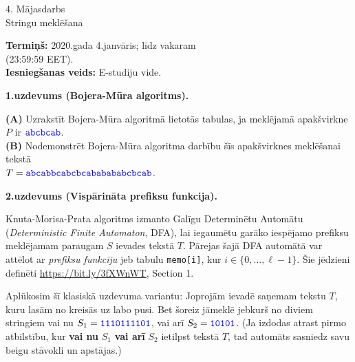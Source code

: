 \documentclass[a4paper]{article}
\begin{document}
\twocolumn

\begin{center}
{\Large 4. Mājasdarbs}\\
{\Large Stringu meklēšana}
\end{center}


{\bf Termiņš:} 2020.gada 4.janvāris; līdz vakaram\\ (23:59:59 EET).\\
{\bf Iesniegšanas veids:} E-studiju vide.





\vspace{10pt}
{\bf 1.uzdevums (Bojera-Mūra algoritms).}

{\bf (A)} Uzrakstīt Bojera-Mūra algoritmā lietotās ta\-bu\-las, ja meklējamā 
apakšvirkne $P$ ir $\textcolor{blue}{\mathtt{abcbcab}}$.\\
{\bf (B)} Nodemonstrēt Bojera-Mūra algoritma darbību šīs apakšvirknes 
meklēšanai tekstā\\ $T = \textcolor{blue}{\mathtt{abcabbcabcbcababababcbcab}}$.



\vspace{10pt}
{\bf 2.uzdevums (Vispārināta prefiksu funkcija).}

Knuta-Morisa-Prata algoritms izmanto Ga\-lī\-gu De\-ter\-mi\-nē\-tu Automātu ({\em Deterministic Finite Automaton}, DFA), 
lai iegaumētu garāko iespējamo prefiksu meklējamam paraugam $S$ ievades tekstā $T$. 
Pārejas šajā DFA automātā var attēlot ar {\em prefiksu funkciju} jeb tabulu {\tt memo[i]}, 
kur $i \in \{ 0,\ldots,\ell{}-1 \}$. Šie jēdzieni definēti \url{https://bit.ly/3fXWnWT}, Section 1. 

Aplūkosim šī klasiskā uzdevuma variantu: Joprojām ievadē saņemam tekstu $T$, kuru lasām no kreisās uz labo pusi.
Bet šoreiz jāmeklē jebkurš no diviem stringiem \textendash{} vai nu 
$S_1 = \textcolor{blue}{\mathtt{1110111101}}$, vai arī
$S_2 = \textcolor{blue}{\mathtt{10101}}$. (Ja izdodas atrast pirmo atbilstību, kur 
{\bf vai nu} $S_1$ {\bf vai arī} $S_2$ ietilpst tekstā $T$, tad automāts sasniedz savu beigu stāvokli 
un apstājas.)
\end{document}

